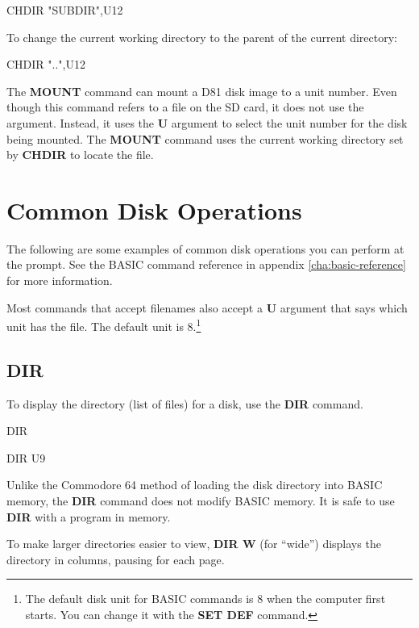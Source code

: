 \begin{screenoutput}
CHDIR "SUBDIR",U12
\end{screenoutput}

To change the current working directory to the parent of the current directory:

\begin{screenoutput}
CHDIR "..",U12
\end{screenoutput}

The {\bf MOUNT} command can mount a D81 disk image to a unit number. Even though this command refers to a file on the SD card, it does not use the  argument. Instead, it uses the {\bf U} argument to select the unit number for the disk being mounted. The {\bf MOUNT} command uses the current working directory set by {\bf CHDIR} to locate the file.


\section{Common Disk Operations}

The following are some examples of common disk operations you can perform at the  prompt. See the BASIC command reference in appendix \vref{cha:basic-reference} for more information.

Most commands that accept filenames also accept a {\bf U} argument that says which unit has the file. The default unit is 8.\footnote{The default disk unit for BASIC commands is 8 when the computer first starts. You can change it with the {\bf SET DEF} command.}

\subsection{DIR}

To display the directory (list of files) for a disk, use the {\bf DIR} command.

\begin{screenoutput}
DIR

DIR U9
\end{screenoutput}

Unlike the Commodore 64 method of loading the disk directory into BASIC memory, the {\bf DIR} command does not modify BASIC memory. It is safe to use {\bf DIR} with a program in memory.

To make larger directories easier to view, {\bf DIR W} (for ``wide'') displays the directory in columns, pausing for each page.

